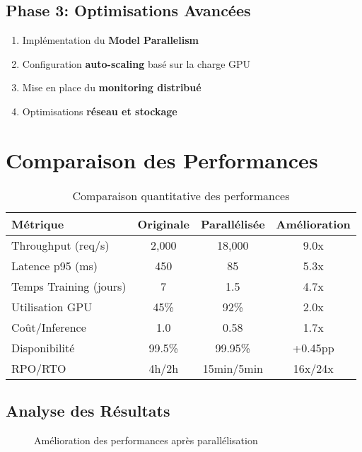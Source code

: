 \documentclass[12pt,a4paper]{article}
\begin{document}
\subsection{Phase 3: Optimisations Avancées}
\begin{enumerate}
\item Implémentation du \textbf{Model Parallelism}
\item Configuration \textbf{auto-scaling} basé sur la charge GPU
\item Mise en place du \textbf{monitoring distribué}
\item Optimisations \textbf{réseau et stockage}
\end{enumerate}

\section{Comparaison des Performances}

\begin{table}[H]
\centering
\renewcommand{\arraystretch}{1.4}
\begin{tabular}{|l|c|c|c|}
\hline
\textbf{Métrique} & \textbf{Originale} & \textbf{Parallélisée} & \textbf{Amélioration} \\
\hline
Throughput (req/s) & 2,000 & 18,000 & 9.0x \\
Latence p95 (ms) & 450 & 85 & 5.3x \\
Temps Training (jours) & 7 & 1.5 & 4.7x \\
Utilisation GPU & 45\% & 92\% & 2.0x \\
Coût/Inference & 1.0 & 0.58 & 1.7x \\
Disponibilité & 99.5\% & 99.95\% & +0.45pp \\
RPO/RTO & 4h/2h & 15min/5min & 16x/24x \\
\hline
\end{tabular}
\caption{Comparaison quantitative des performances}
\end{table}

\subsection{Analyse des Résultats}

\begin{figure}[H]
\centering
{}
\caption{Amélioration des performances après parallélisation}
\end{figure}
\end{document}
